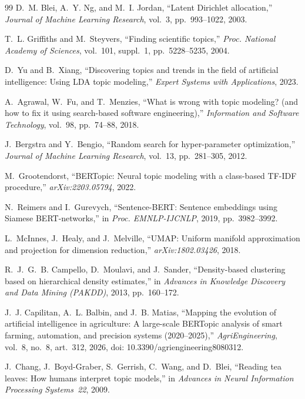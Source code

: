 \begin{thebibliography}{99}
D.~M. Blei, A.~Y. Ng, and M.~I. Jordan, ``Latent Dirichlet allocation,'' \emph{Journal of Machine
Learning Research}, vol.~3, pp.~993--1022, 2003.

T.~L. Griffiths and M.~Steyvers, ``Finding scientific topics,'' \emph{Proc. National Academy of
Sciences}, vol.~101, suppl.~1, pp.~5228--5235, 2004.

D.~Yu and B.~Xiang, ``Discovering topics and trends in the field of artificial intelligence: Using
LDA topic modeling,'' \emph{Expert Systems with Applications}, 2023.

A.~Agrawal, W.~Fu, and T.~Menzies, ``What is wrong with topic modeling? (and how to fix it using
search-based software engineering),'' \emph{Information and Software Technology}, vol.~98,
pp.~74--88, 2018.

J.~Bergstra and Y.~Bengio, ``Random search for hyper-parameter optimization,'' \emph{Journal of
Machine Learning Research}, vol.~13, pp.~281--305, 2012.

M.~Grootendorst, ``BERTopic: Neural topic modeling with a class-based TF-IDF procedure,''
\emph{arXiv:2203.05794}, 2022.

N.~Reimers and I.~Gurevych, ``Sentence-BERT: Sentence embeddings using Siamese BERT-networks,'' in
\emph{Proc. EMNLP-IJCNLP}, 2019, pp.~3982--3992.

L.~McInnes, J.~Healy, and J.~Melville, ``UMAP: Uniform manifold approximation and projection for
dimension reduction,'' \emph{arXiv:1802.03426}, 2018.

R.~J.~G.~B. Campello, D.~Moulavi, and J.~Sander, ``Density-based clustering based on hierarchical
density estimates,'' in \emph{Advances in Knowledge Discovery and Data Mining (PAKDD)}, 2013,
pp.~160--172.

J.~J. Capilitan, A.~L. Balbin, and J.~B. Matias, ``Mapping the evolution of artificial intelligence
in agriculture: A large-scale BERTopic analysis of smart farming, automation, and precision
systems (2020--2025),'' \emph{AgriEngineering}, vol.~8, no.~8, art.~312, 2026,
doi: 10.3390/agriengineering8080312.

J.~Chang, J.~Boyd-Graber, S.~Gerrish, C.~Wang, and D.~Blei, ``Reading tea leaves: How humans
interpret topic models,'' in \emph{Advances in Neural Information Processing Systems~22}, 2009.


\end{thebibliography}
